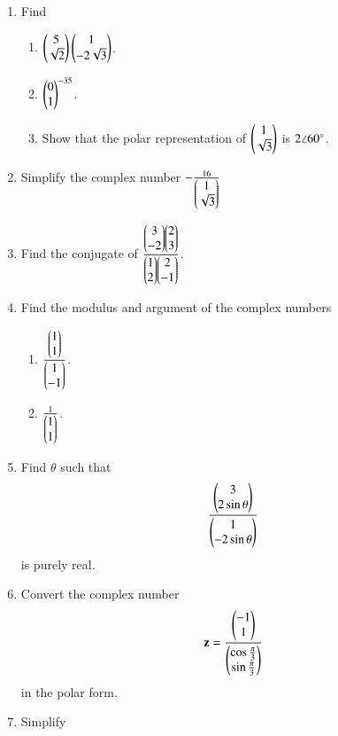 \begin{enumerate}[label=\arabic*.,ref=\thesubsection.\theenumi]
\item Find 
\begin{enumerate}
\item $\begin{pmatrix}5\\ \sqrt{2}\end{pmatrix} \begin{pmatrix}1 \\ - 2\sqrt{3}\end{pmatrix}$.
\item $\begin{pmatrix}0 \\ 1\end{pmatrix}^{-35}$.
\item Show that the polar representation of $\begin{pmatrix}1\\\sqrt{3}\end{pmatrix}$ is $2\angle 60\degree$.
\end{enumerate}
\item Simplify the complex number $-\frac{16}{\begin{pmatrix}1 \\ \sqrt{3}\end{pmatrix}}$
\\
\solution 

\item Find the conjugate of $\frac{\begin{pmatrix}3 \\ -2\end{pmatrix}\begin{pmatrix}2 \\ 3\end{pmatrix}}{\begin{pmatrix}1 \\ 2\end{pmatrix}\begin{pmatrix}2 \\ -1\end{pmatrix}}$.
\\
\solution

\item Find the modulus and argument of the complex numbers
\begin{enumerate}
\item $\frac{\begin{pmatrix}1\\1\end{pmatrix}}{\begin{pmatrix}1\\-1\end{pmatrix}}$.
\item $\frac{1}{\begin{pmatrix}1\\1\end{pmatrix}}$.
\end{enumerate}
\solution

\item Find $\theta$ such that 
\begin{align}
\frac{\begin{pmatrix}3\\2\sin\theta\end{pmatrix}}{\begin{pmatrix}1\\-2\sin\theta\end{pmatrix}}
\end{align}
%
is purely real.
\item Convert the complex number 
\begin{align}
\mathbf{z} = \frac{\begin{pmatrix}-1\\1\end{pmatrix}}{\begin{pmatrix}\cos \frac{\pi}{3}\\ \sin\frac{\pi}{3}\end{pmatrix}}
\end{align}
%
in the polar form.
%
\item Simplify 
%
\begin{align}

\end{align}
\end{enumerate}
